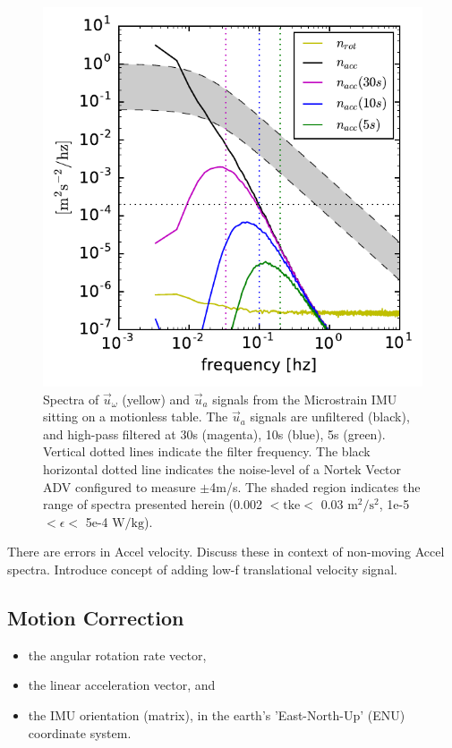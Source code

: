 \documentclass[twocol]{ametsoc}
\newlength{\onewidth}
\def\earth{}
\def\ue{\ensuremath{\vec{u}\earth}}
\def\uacc{\ensuremath{\ue_a}}
\def\tke{\ensuremath{\mathrm{tke}}}
\def\ue{\ensuremath{\vec{u}\earth}}
\def\urot{\ensuremath{\ue_\omega}}
\def\uacc{\ensuremath{\ue_a}}
\begin{document}
\begin{figure}
  \centering
  \label{fig:stationary_noise}
  \includegraphics[width=\onewidth]{stationary_noise03}
  \caption{Spectra of $\urot$ (yellow) and $\uacc$ signals from the Microstrain IMU sitting on a motionless table. The $\uacc$ signals are unfiltered (black), and high-pass filtered at 30s (magenta), 10s (blue), 5s (green). Vertical dotted lines indicate the filter frequency. The black horizontal dotted line indicates the noise-level of a Nortek Vector ADV configured to measure $\pm$4m/s. The shaded region indicates the range of spectra presented herein (0.002 $< \tke <$ 0.03 $\mathrm{m^2/s^2}$, 1e-5 $< \epsilon <$ 5e-4 $\mathrm{W/kg}$).}
\end{figure}

There are errors in Accel velocity. Discuss these in context of non-moving Accel spectra. Introduce concept of adding low-f translational velocity signal.

\subsection{Motion Correction}\label{sec:proc:motion}

\begin{itemize}
\item the angular rotation rate vector,
\item the linear acceleration vector, and
\item the IMU orientation (matrix), in the earth's 'East-North-Up' (ENU) coordinate system.
\end{itemize}
\end{document}
